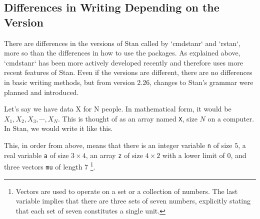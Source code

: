 \documentclass{ltjsbook}
\begin{document}
\subsection{Differences in Writing Depending on the Version}
There are differences in the versions of Stan called by `cmdstanr` and `rstan`, more so than the differences in how to use the packages. As explained above, `cmdstanr` has been more actively developed recently and therefore uses more recent features of Stan.
Even if the versions are different, there are no differences in basic writing methods, but from version 2.26, changes to Stan's grammar were planned and introduced.



Let's say we have data X for N people. In mathematical form, it would be $X_1,X_2,X_3,\cdots, X_N$. This is thought of as an array named \verb|X|, size $N$ on a computer. In Stan, we would write it like this.


This, in order from above, means that there is an integer variable \verb|n| of size $5$, a real variable \verb|a| of size $3 \times 4$, an array \verb|z| of size $4 \times 2$ with a lower limit of $0$, and three vectors \verb|mu| of length $7$ \footnote{Vectors are used to operate on a set or a collection of numbers. The last variable implies that there are three sets of seven numbers, explicitly stating that each set of seven constitutes a single unit.}.
\end{document}
